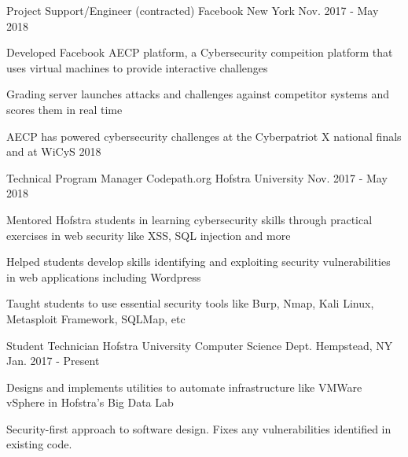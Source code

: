 

\begin{cventries}


    \cventry
    {Project Support/Engineer (contracted) } %
    {Facebook} %
    {New York} %
    {Nov. 2017 - May 2018} %
    {
      \begin{cvitems} %
      \item {Developed Facebook AECP platform, a Cybersecurity compeition platform that uses virtual machines to provide interactive challenges }
      \item {Grading server launches attacks and challenges against competitor systems and scores them in real time}
      \item {AECP has powered cybersecurity challenges at the Cyberpatriot X national finals and at WiCyS 2018}
      \end{cvitems}
    }
\cventry
    {Technical Program Manager} %
    {Codepath.org} %
    {Hofstra University} %
    {Nov. 2017 - May 2018} %
    {
      \begin{cvitems} %
        \item {Mentored Hofstra students in learning cybersecurity skills through practical exercises in web security like XSS, SQL injection and more}
        \item {Helped students develop skills identifying and exploiting security vulnerabilities in web applications including Wordpress}
        \item {Taught students to use essential security tools like Burp, Nmap, Kali Linux, Metasploit Framework, SQLMap, etc}
      \end{cvitems}
    }

  \cventry
    {Student Technician} %
    {Hofstra University Computer Science Dept.} %
    {Hempstead, NY} %
    {Jan. 2017 - Present} %
    {
      \begin{cvitems} %
        \item {Designs and implements utilities to automate infrastructure like VMWare vSphere in Hofstra's Big Data Lab}
        \item {Security-first approach to software design. Fixes any vulnerabilities identified in existing code.} 
      \end{cvitems}
    }

\end{cventries}

